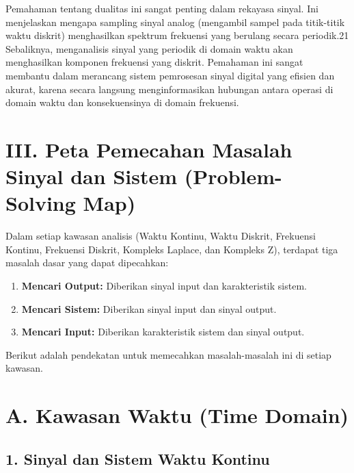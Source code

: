 \documentclass[
  letterpaper,
  DIV=11,
  numbers=noendperiod]{scrreprt}
\begin{document}
Pemahaman tentang dualitas ini sangat penting dalam rekayasa sinyal. Ini
menjelaskan mengapa sampling sinyal analog (mengambil sampel pada
titik-titik waktu diskrit) menghasilkan spektrum frekuensi yang berulang
secara periodik.21 Sebaliknya, menganalisis sinyal yang periodik di
domain waktu akan menghasilkan komponen frekuensi yang diskrit.
Pemahaman ini sangat membantu dalam merancang sistem pemrosesan sinyal
digital yang efisien dan akurat, karena secara langsung menginformasikan
hubungan antara operasi di domain waktu dan konsekuensinya di domain
frekuensi.

\section{III. Peta Pemecahan Masalah Sinyal dan Sistem (Problem-Solving
Map)}\label{iii.-peta-pemecahan-masalah-sinyal-dan-sistem-problem-solving-map}

Dalam setiap kawasan analisis (Waktu Kontinu, Waktu Diskrit, Frekuensi
Kontinu, Frekuensi Diskrit, Kompleks Laplace, dan Kompleks Z), terdapat
tiga masalah dasar yang dapat dipecahkan:

\begin{enumerate}
\def\labelenumi{\arabic{enumi}.}
\item
  \textbf{Mencari Output:} Diberikan sinyal input dan karakteristik
  sistem.
\item
  \textbf{Mencari Sistem:} Diberikan sinyal input dan sinyal output.
\item
  \textbf{Mencari Input:} Diberikan karakteristik sistem dan sinyal
  output.
\end{enumerate}

Berikut adalah pendekatan untuk memecahkan masalah-masalah ini di setiap
kawasan.

\section{A. Kawasan Waktu (Time
Domain)}\label{a.-kawasan-waktu-time-domain-1}

\subsection{1. Sinyal dan Sistem Waktu
Kontinu}\label{sinyal-dan-sistem-waktu-kontinu}
\end{document}
